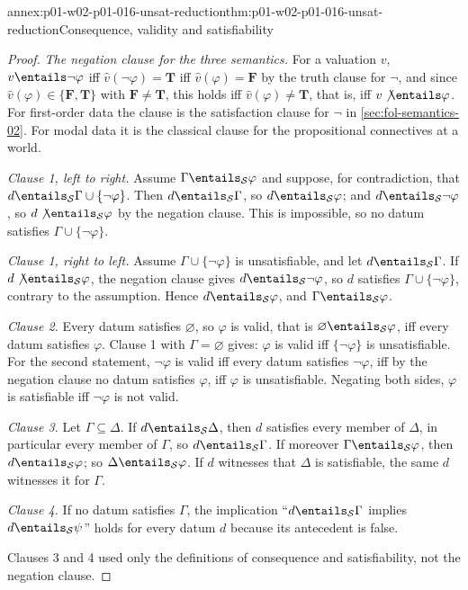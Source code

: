 \begin{annexitem}{annex:p01-w02-p01-016-unsat-reduction}{thm:p01-w02-p01-016-unsat-reduction}{Consequence, validity and satisfiability}
\begin{proof}
\emph{The negation clause for the three semantics.} For a valuation \(v\),
\(v\entails\neg\varphi\) iff \(\widehat v(\neg\varphi)=\mathbf T\) iff
\(\widehat v(\varphi)=\mathbf F\) by the truth clause for \(\neg\), and since
\(\widehat v(\varphi)\in\{\mathbf F,\mathbf T\}\) with
\(\mathbf F\ne\mathbf T\), this holds iff
\(\widehat v(\varphi)\ne\mathbf T\), that is, iff \(v\not\entails\varphi\).
For first-order data the clause is the satisfaction clause for \(\neg\) in
\cref{sec:fol-semantics-02}. For modal data it is the classical clause for
the propositional connectives at a world.

\emph{Clause 1, left to right.} Assume \(\Gamma\entails_{\mathcal S}\varphi\)
and suppose, for contradiction, that
\(d\entails_{\mathcal S}\Gamma\cup\{\neg\varphi\}\). Then
\(d\entails_{\mathcal S}\Gamma\), so \(d\entails_{\mathcal S}\varphi\); and
\(d\entails_{\mathcal S}\neg\varphi\), so \(d\not\entails_{\mathcal S}\varphi\)
by the negation clause. This is impossible, so no datum satisfies
\(\Gamma\cup\{\neg\varphi\}\).

\emph{Clause 1, right to left.} Assume \(\Gamma\cup\{\neg\varphi\}\) is
unsatisfiable, and let \(d\entails_{\mathcal S}\Gamma\). If
\(d\not\entails_{\mathcal S}\varphi\), the negation clause gives
\(d\entails_{\mathcal S}\neg\varphi\), so \(d\) satisfies
\(\Gamma\cup\{\neg\varphi\}\), contrary to the assumption. Hence
\(d\entails_{\mathcal S}\varphi\), and \(\Gamma\entails_{\mathcal S}\varphi\).

\emph{Clause 2.} Every datum satisfies \(\varnothing\), so \(\varphi\) is
valid, that is \(\varnothing\entails_{\mathcal S}\varphi\), iff every datum
satisfies \(\varphi\). Clause 1 with \(\Gamma=\varnothing\) gives: \(\varphi\)
is valid iff \(\{\neg\varphi\}\) is unsatisfiable. For the second statement,
\(\neg\varphi\) is valid iff every datum satisfies \(\neg\varphi\), iff by the
negation clause no datum satisfies \(\varphi\), iff \(\varphi\) is
unsatisfiable. Negating both sides, \(\varphi\) is satisfiable iff
\(\neg\varphi\) is not valid.

\emph{Clause 3.} Let \(\Gamma\subseteq\Delta\). If
\(d\entails_{\mathcal S}\Delta\), then \(d\) satisfies every member of
\(\Delta\), in particular every member of \(\Gamma\), so
\(d\entails_{\mathcal S}\Gamma\). If moreover
\(\Gamma\entails_{\mathcal S}\varphi\), then \(d\entails_{\mathcal S}\varphi\);
so \(\Delta\entails_{\mathcal S}\varphi\). If \(d\) witnesses that \(\Delta\)
is satisfiable, the same \(d\) witnesses it for \(\Gamma\).

\emph{Clause 4.} If no datum satisfies \(\Gamma\), the implication
``\(d\entails_{\mathcal S}\Gamma\) implies \(d\entails_{\mathcal S}\psi\)''
holds for every datum \(d\) because its antecedent is false.

Clauses 3 and 4 used only the definitions of consequence and satisfiability,
not the negation clause.
\end{proof}
\end{annexitem}

